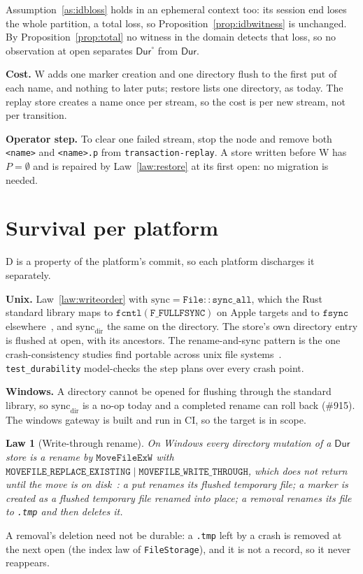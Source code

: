 \documentclass[journal]{IEEEtran}
\newtheorem{law}{Law}
\newcommand{\Durable}{\mathsf{Dur}}
\newcommand{\issue}[1]{\#{#1}}
\begin{document}
Assumption~\ref{as:idbloss} holds in an ephemeral context too: its session end loses the
whole partition, a total loss, so Proposition~\ref{prop:idbwitness} is unchanged.  By
Proposition~\ref{prop:total} no witness in the domain detects that loss, so no observation at
open separates $\Durable^{\circ}$ from $\Durable$.



\textbf{Cost.}  W adds one marker creation and one directory flush to the first
$\mathrm{put}$ of each name, and nothing to later puts; restore lists one directory, as
today.  The replay store creates a name once per stream, so the cost is per new stream, not
per transition.

\textbf{Operator step.}  To clear one failed stream, stop the node and remove both
\texttt{<name>} and \texttt{<name>.p} from \texttt{transaction-replay}.  A store written
before W has $P=\emptyset$ and is repaired by Law~\ref{law:restore} at its first open: no
migration is needed.

\section{Survival per platform}\label{sec:survival}

D is a property of the platform's commit, so each platform discharges it separately.

\textbf{Unix.}  Law~\ref{law:writeorder} with
$\mathrm{sync}=\mathtt{File::sync\_all}$, which the Rust standard library maps to
$\mathtt{fcntl}(\mathtt{F\_FULLFSYNC})$ on Apple targets and to $\mathtt{fsync}$
elsewhere~\cite{AppleFsync}, and $\mathrm{sync}_{\mathrm{dir}}$ the same on the directory.
The store's own directory entry is flushed at open, with its ancestors.  The rename-and-sync
pattern is the one crash-consistency studies find portable across unix file
systems~\cite{Pillai2014}.  \texttt{test\_durability} model-checks the step plans over every
crash point.

\textbf{Windows.}  A directory cannot be opened for flushing through the standard library,
so $\mathrm{sync}_{\mathrm{dir}}$ is a no-op today and a completed rename can roll back
(\issue{915}).  The windows gateway is built and run in CI, so the target is in scope.
\begin{law}[Write-through rename]\label{law:writethrough}
On Windows every directory mutation of a $\Durable$ store is a rename by
$\mathtt{MoveFileExW}$ with
$\mathtt{MOVEFILE\_REPLACE\_EXISTING}\mid\mathtt{MOVEFILE\_WRITE\_THROUGH}$, which does not
return until the move is on disk~\cite{MoveFileEx}: a put renames its flushed temporary
file; a marker is created as a flushed temporary file renamed into place; a removal renames
its file to \texttt{.tmp} and then deletes it.
\end{law}
A removal's deletion need not be durable: a \texttt{.tmp} left by a crash is removed at the
next open (the index law of \texttt{FileStorage}), and it is not a record, so it never
reappears.
\end{document}
